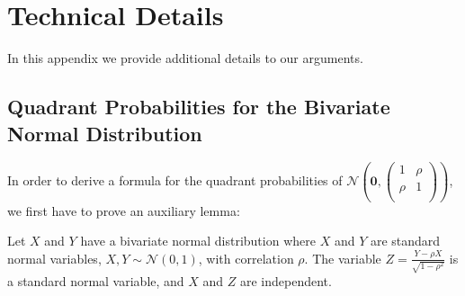 \documentclass[../../main.tex]{subfiles}
\begin{document}
\chapter{Technical Details}
\label{section:technical_details}
In this appendix we provide additional details to our arguments.

\section{Quadrant Probabilities for the Bivariate Normal Distribution}
\label{section:integrating_quadrants}
In order to derive a formula for the quadrant probabilities of $\mathcal{N}\left(\bm{0}, \begin{pmatrix*}
    1 & \rho \\
    \rho & 1 \\
\end{pmatrix*}\right)$, we first have to prove an auxiliary lemma:

\begin{lemma}
Let $X$ and $Y$ have a bivariate normal distribution where $X$ and $Y$ are standard normal variables, $X, Y \sim \mathcal{N}(0,1)$, with correlation $\rho$. The variable $Z = \frac{Y-\rho X}{\sqrt{1-\rho^2}}$ is a standard normal variable, and $X$ and $Z$ are independent.
\end{lemma}
\end{document}
